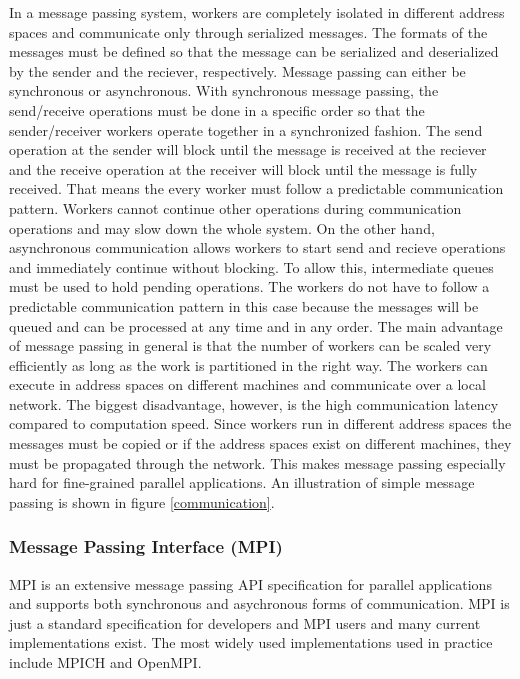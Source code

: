 \documentclass[11pt]{book}
\begin{document}
In a message passing system, workers are completely isolated in different address spaces
and communicate only through serialized messages. The formats of the messages must be
defined so that the message can be serialized and deserialized by the sender and the reciever,
respectively. Message passing can either be synchronous or asynchronous. With synchronous
message passing, the send/receive operations must be done in a specific order so that the
sender/receiver workers operate together in a synchronized fashion. The send operation at
the sender will block until the message is received at the reciever and the receive operation
at the receiver will block until the message is fully received. That means the every worker
must follow a predictable communication pattern. Workers cannot continue other operations
during communication operations and may slow down the whole system. On the other hand,
asynchronous communication allows workers to start send and recieve operations and immediately
continue without blocking. To allow this, intermediate queues must be used to hold pending
operations. The workers do not have to follow a predictable communication pattern in this
case because the messages will be queued and can be processed at any time and in any order.
The main advantage of message passing in general is that the number of workers can be scaled
very efficiently as long as the work is partitioned in the right way. The workers can execute
in address spaces on different machines and communicate over a local network. The biggest
disadvantage, however, is the high communication latency compared to computation speed.
Since workers run in different address spaces the messages must be copied or if the address
spaces exist on different machines, they must be propagated through the network. This makes
message passing especially hard for fine-grained parallel applications. An illustration of
simple message passing is shown in figure \ref{communication}.

\subsubsection{Message Passing Interface (MPI)}

MPI\cite{Forum:1994:MMI:898758} is an extensive message passing API specification for parallel
applications and supports both synchronous and asychronous forms of communication. MPI is just
a standard specification for developers and MPI users and many current implementations exist.
The most widely used implementations used in practice include MPICH and OpenMPI.
\end{document}
